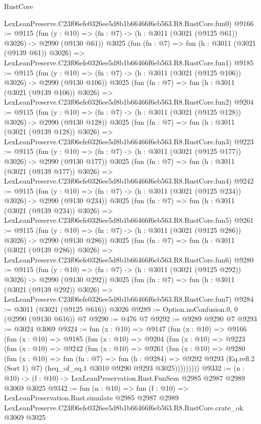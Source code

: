 \begin{lexlean}{RustCore}
\begin{coremodule}
    LexLeanPreserve.C23f06efe0326ee5d8b1b66466f6eb563.R8.RustCore.fun0)
@9166 := @9115
    (fun (y : @10) => (fn : @7) -> (h : @3011 (@3021 (@9125 @61)) @3026) -> @2990 (@9130 @61))
    @3025
    (fun (fn : @7) =>
    fun (h : @3011 (@3021 (@9139 @61)) @3026) =>
    LexLeanPreserve.C23f06efe0326ee5d8b1b66466f6eb563.R8.RustCore.fun1)
@9185 := @9115
    (fun (y : @10) => (fn : @7) -> (h : @3011 (@3021 (@9125 @106)) @3026) -> @2990 (@9130 @106))
    @3025
    (fun (fn : @7) =>
    fun (h : @3011 (@3021 (@9139 @106)) @3026) =>
    LexLeanPreserve.C23f06efe0326ee5d8b1b66466f6eb563.R8.RustCore.fun2)
@9204 := @9115
    (fun (y : @10) => (fn : @7) -> (h : @3011 (@3021 (@9125 @128)) @3026) -> @2990 (@9130 @128))
    @3025
    (fun (fn : @7) =>
    fun (h : @3011 (@3021 (@9139 @128)) @3026) =>
    LexLeanPreserve.C23f06efe0326ee5d8b1b66466f6eb563.R8.RustCore.fun3)
@9223 := @9115
    (fun (y : @10) => (fn : @7) -> (h : @3011 (@3021 (@9125 @177)) @3026) -> @2990 (@9130 @177))
    @3025
    (fun (fn : @7) =>
    fun (h : @3011 (@3021 (@9139 @177)) @3026) =>
    LexLeanPreserve.C23f06efe0326ee5d8b1b66466f6eb563.R8.RustCore.fun4)
@9242 := @9115
    (fun (y : @10) => (fn : @7) -> (h : @3011 (@3021 (@9125 @234)) @3026) -> @2990 (@9130 @234))
    @3025
    (fun (fn : @7) =>
    fun (h : @3011 (@3021 (@9139 @234)) @3026) =>
    LexLeanPreserve.C23f06efe0326ee5d8b1b66466f6eb563.R8.RustCore.fun5)
@9261 := @9115
    (fun (y : @10) => (fn : @7) -> (h : @3011 (@3021 (@9125 @286)) @3026) -> @2990 (@9130 @286))
    @3025
    (fun (fn : @7) =>
    fun (h : @3011 (@3021 (@9139 @286)) @3026) =>
    LexLeanPreserve.C23f06efe0326ee5d8b1b66466f6eb563.R8.RustCore.fun6)
@9280 := @9115
    (fun (y : @10) => (fn : @7) -> (h : @3011 (@3021 (@9125 @292)) @3026) -> @2990 (@9130 @292))
    @3025
    (fun (fn : @7) =>
    fun (h : @3011 (@3021 (@9139 @292)) @3026) =>
    LexLeanPreserve.C23f06efe0326ee5d8b1b66466f6eb563.R8.RustCore.fun7)
@9284 := @3011 (@3021 (@9125 @616)) @3026
@9289 := Option.noConfusion.{0, 0} (@2990 (@9130 @616)) @7
@9290 := @476 @7
@9292 := @9289 @9290 @7
@9293 := @3024 @3069
@9324 := fun (x : @10) =>
  @9147
    (fun (x : @10) =>
    @9166
      (fun (x : @10) =>
      @9185
        (fun (x : @10) =>
        @9204
          (fun (x : @10) =>
          @9223
            (fun (x : @10) =>
            @9242
              (fun (x : @10) =>
              @9261
                (fun (x : @10) =>
                @9280
                  (fun (x : @10) =>
                  fun (fn : @7) =>
                  fun (h : @9284) =>
                  @9292
                    @9293
                    (Eq.refl.{2} (Sort 1) @7)
                    (heq_of_eq.{1} @3010 @9290 @9293 @3025)))))))))
@9332 := (n : @10) -> (f : @10) -> LexLeanPreservation.Rust.FunSem @2985 @2987 @2989 @3069 @3025
@9342 := fun (n : @10) =>
  fun (f : @10) =>
  LexLeanPreservation.Rust.simulate
    @2985
    @2987
    @2989
    LexLeanPreserve.C23f06efe0326ee5d8b1b66466f6eb563.R8.RustCore.crate_ok
    @3069
    @3025
\end{coremodule}
\end{lexlean}
